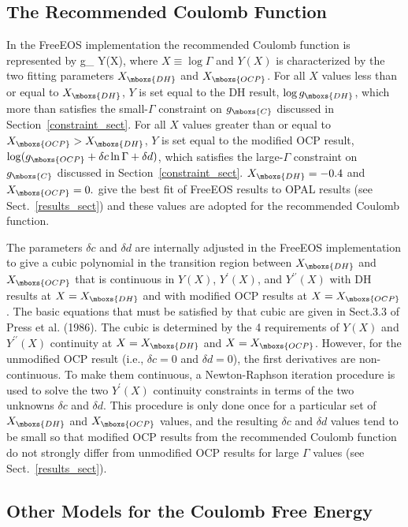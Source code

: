 \subsection{The Recommended Coulomb Function}

In the FreeEOS implementation the recommended Coulomb function is
represented by \be \log g_{} \equiv Y(X), \ee where $X \equiv \log
\Gamma$ and $Y(X)$ is characterized by the two fitting parameters
$X_{\mboxs{DH}}$ and $X_{\mboxs{OCP}}$.  For all $X$ values less than or
equal to $X_{\mboxs{DH}}$, $Y$ is set equal to the DH result, $\log
g_{\mboxs{DH}}$, which more than satisfies the small-$\Gamma$ constraint on
$g_{\mboxs{C}}$ discussed in Section~\ref{constraint_sect}.  For all $X$
values greater than or equal to $X_{\mboxs{OCP}} > X_{\mboxs{DH}}$, $Y$ is
set equal to the modified OCP result, $\log (g_{\mboxs{OCP}} + \delta c \ln
\Gamma + \delta d)$, which satisfies the large-$\Gamma$ constraint on
$g_{\mboxs{C}}$ discussed in Section~\ref{constraint_sect}.
$X_{\mboxs{DH}}=-0.4$ and $X_{\mboxs{OCP}}=0.$ give the best fit of FreeEOS
results to OPAL results (see Sect.~\ref{results_sect}) and these values are
adopted for the recommended Coulomb function.

The parameters $\delta c$ and $\delta d$ are internally adjusted in the
FreeEOS implementation to give a cubic polynomial in the transition region
between $X_{\mboxs{DH}}$ and $X_{\mboxs{OCP}}$ that is continuous in $Y(X)$,
$Y^{\prime}(X)$, and $Y^{\prime\prime}(X)$ with DH results at
$X=X_{\mboxs{DH}}$ and with modified OCP results at $X=X_{\mboxs{OCP}}$. The
basic equations that must be satisfied by that cubic are given in Sect.3.3
of Press et al. (1986).  The cubic is determined by the 4 requirements of
$Y(X)$ and $Y^{\prime\prime}(X)$ continuity at $X=X_{\mboxs{DH}}$ and
$X=X_{\mboxs{OCP}}$. However, for the unmodified OCP result (i.e., $\delta
c=0$ and $\delta d=0$), the first derivatives are non-continuous.  To make
them continuous, a Newton-Raphson iteration procedure is used to solve the
two $Y^{\prime}(X)$ continuity constraints in terms of the two unknowns
$\delta c$ and $\delta d$.  This procedure is only done once for a
particular set of $X_{\mboxs{DH}}$ and $X_{\mboxs{OCP}}$ values, and the
resulting $\delta c$ and $\delta d$ values tend to be small so that modified
OCP results from the recommended Coulomb function do not strongly differ
from unmodified OCP results for large $\Gamma$ values (see
Sect.~\ref{results_sect}).

\subsection{Other Models for the Coulomb Free Energy}

